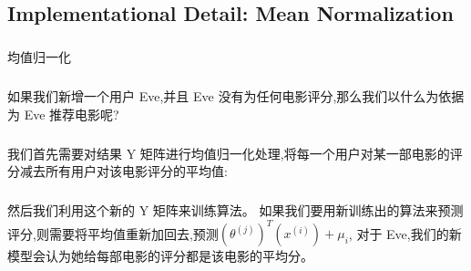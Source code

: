 \documentclass{article}
\begin{document}
\begin{CJK}{UTF8}{gbsn}
\subsection{Implementational Detail: Mean Normalization}
\subparagraph{}
均值归一化
\subparagraph{}
\begin{figure}[H]
\label{fig:9920}
\end{figure}
\subparagraph{}
如果我们新增一个用户 Eve,并且 Eve 没有为任何电影评分,那么我们以什么为依据为 Eve 推荐电影呢?
\subparagraph{}
我们首先需要对结果 Y 矩阵进行均值归一化处理,将每一个用户对某一部电影的评分减去所有用户对该电影评分的平均值:
\begin{figure}[H]
\label{fig:9921}
\end{figure}
\begin{figure}[H]
\label{fig:9922}
\end{figure}
\subparagraph{}
然后我们利用这个新的 Y 矩阵来训练算法。 如果我们要用新训练出的算法来预测评分,则需要将平均值重新加回去,预测${(\theta^{(j)})}^T(x^{(i)})+\mu_i$, 对于 Eve,我们的新模型会认为她给每部电影的评分都是该电影的平均分。
\begin{figure}[H]
\label{fig:9923}
\end{figure}
\begin{figure}[H]
\label{fig:9925}
\end{figure}
\begin{figure}[H]
\label{fig:9926}
\end{figure}
\begin{figure}[H]
\label{fig:9927}
\end{figure}
\begin{figure}[H]
\label{fig:9928}
\end{figure}
\begin{figure}[H]
\label{fig:9929}
\end{figure}
\begin{figure}[H]
\label{fig:9930}
\end{figure}
\begin{figure}[H]
\label{fig:9931}
\end{figure}
\begin{figure}[H]
\label{fig:9932}
\end{figure}
\begin{figure}[H]
\label{fig:9933}
\end{figure}
\begin{figure}[H]
\label{fig:9934}
\end{figure}
\end{CJK}
\end{document}
